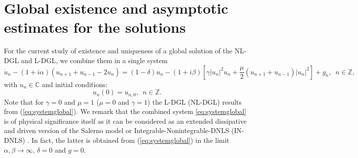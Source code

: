 \documentclass[preprintnumbers,amsmath,amssymb]{revtex4}
\begin{document}
\section{Global existence and asymptotic estimates for the solutions}\label{subsection:existence}
\setcounter{equation}{0}
For the current study of existence and uniqueness of a global solution of the NL-DGL and L-DGL, we combine them in a single system
\begin{equation}
\dot{u}_n-(1+i\alpha)(u_{n+1}+u_{n-1}-2u_n)=(1-\delta)u_n-
(1+i\beta)\left[\gamma|u_n|^2u_n+\frac{\mu}{2}(u_{n+1}+u_{n-1})|u_n|^2\right]+g_n,\,\,\,n\in {\mathbb{Z}},\label{eq:systemglobal}
\end{equation}
with $u_n \in {\mathbb{C}}$ and initial conditions:
\begin{equation}
u_{n}(0)=u_{n,0},\,\,\,n \in {\mathbb{Z}}.\label{eq:icsglobal}
\end{equation}
Note that for $\gamma=0$ and $\mu=1$ ($\mu=0$ and $\gamma=1$) the L-DGL (NL-DGL) results from (\ref{eq:systemglobal}). We remark that the combined system \eqref{eq:systemglobal}
is of physical significance itself as it can be considered as an extended dissipative and driven version of the Salerno model \cite{Salerno} or Integrable-Nonintegrable-DNLS (IN-DNLS) \cite{Cai94}. In fact, the latter is obtained from (\ref{eq:systemglobal}) in the limit $\alpha,\beta \rightarrow \infty$, $\delta=0$ and $g=0$. 
\end{document}
